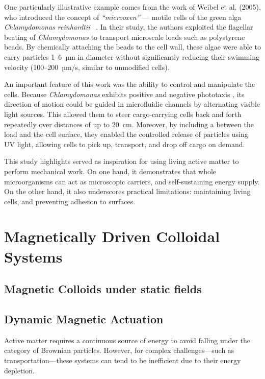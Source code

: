 One particularly illustrative example comes from the work of Weibel et al. (2005), who introduced the concept of \textit{``microoxen''} --- motile cells of the green alga \textit{Chlamydomonas reinhardtii} ~\cite{weibel2005microoxen}. In their study, the authors exploited the flagellar beating of \textit{Chlamydomonas} to transport microscale loads such as polystyrene beads. By chemically attaching the beads to the cell wall, these algae were able to carry particles 1--6~µm in diameter without significantly reducing their swimming velocity (100–200~µm/s, similar to unmodified cells). 

An important feature of this work was the ability to control and manipulate the cells. Because \textit{Chlamydomonas} exhibits positive and negative phototaxis \cite{bennett2015steering}, its direction of motion could be guided in microfluidic channels by alternating visible light sources. This allowed them to steer cargo-carrying cells back and forth repeatedly over distances of up to 20~cm. Moreover, by including a  between the load and the cell surface, they enabled the controlled release of particles using UV light, allowing cells to pick up, transport, and drop off cargo on demand.

This study highlights served as inspiration for using living active matter to perform mechanical work. On one hand, it demonstrates that whole microorganisms can act as microscopic carriers, and self-sustaining energy supply. On the other hand, it also underscores practical limitations: maintaining living cells, and preventing adhesion to surfaces.



\chapter{Magnetically Driven Colloidal Systems}
\label{magneticallydrivencolloidalsystems}

\section{Magnetic Colloids under static fields}

\section{Dynamic Magnetic Actuation}

Active matter requires a continuous source of energy to avoid falling under the category of Brownian particles. However, for complex challenges—such as transportation—these systems can tend to be inefficient due to their energy depletion.

